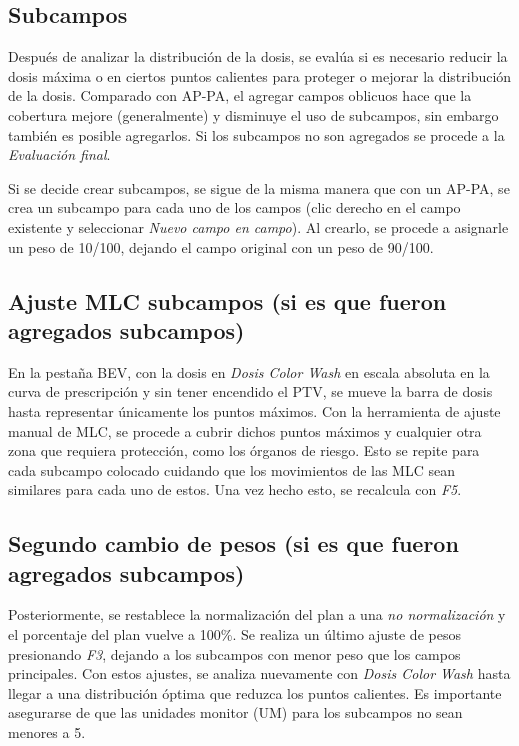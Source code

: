 \documentclass{article}
\begin{document}
\subsection{Subcampos}

Después de analizar la distribución de la dosis, se evalúa si es necesario reducir la dosis máxima o en ciertos puntos calientes para proteger o mejorar la distribución de la dosis. Comparado con AP-PA, el agregar campos oblicuos hace que la cobertura mejore (generalmente) y disminuye el uso de subcampos, sin embargo también es posible agregarlos. Si los subcampos no son agregados se procede a la \textit{Evaluación final}.

Si se decide crear subcampos, se sigue de la misma manera que con un AP-PA, se crea un subcampo para cada uno de los campos (clic derecho en el campo existente y seleccionar \textit{Nuevo campo en campo}). Al crearlo, se procede a asignarle un peso de 10/100, dejando el campo original con un peso de 90/100.

\subsection{Ajuste MLC subcampos (si es que fueron agregados subcampos)}

En la pestaña BEV, con la dosis en \textit{Dosis Color Wash} en escala absoluta en la curva de prescripción y sin tener encendido el PTV, se mueve la barra de dosis hasta representar únicamente los puntos máximos. Con la herramienta de ajuste manual de MLC, se procede a cubrir dichos puntos máximos y cualquier otra zona que requiera protección, como los órganos de riesgo. Esto se repite para cada subcampo colocado cuidando que los movimientos de las MLC sean similares para cada uno de estos. Una vez hecho esto, se recalcula con \textit{F5}.

\subsection{Segundo cambio de pesos (si es que fueron agregados subcampos)}

Posteriormente, se restablece la normalización del plan a una \textit{no normalización} y el porcentaje del plan vuelve a 100\%. Se realiza un último ajuste de pesos presionando \textit{F3}, dejando a los subcampos con menor peso que los campos principales. Con estos ajustes, se analiza nuevamente con \textit{Dosis Color Wash} hasta llegar a una distribución óptima que reduzca los puntos calientes. Es importante asegurarse de que las unidades monitor (UM) para los subcampos no sean menores a 5.
\end{document}
